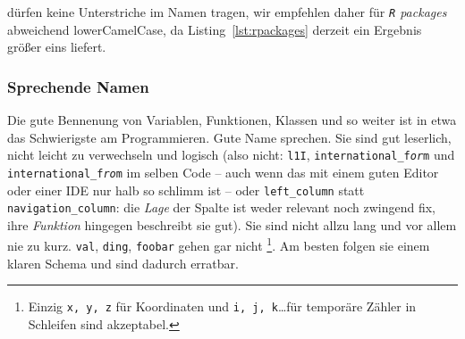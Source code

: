 \documentclass[twoside]{scrartcl}
\providecommand{\R}{\texttt{R}}
\providecommand{\code}[1]{\texttt{#1}}
\begin{document}
 d\"urfen keine Unterstriche im Namen 
tragen, wir
empfehlen daher f\"u{}r \emph{\R{} packages} abweichend lowerCamelCase, 
da Listing~\ref{lst:rpackages} derzeit ein Ergebnis gr\"o{}\ss{}er eins 
liefert.


\subsubsection{Sprechende Namen}
Die gute Bennenung von Variablen, Funktionen, Klassen und so weiter ist in etwa
das Schwierigste am Programmieren. Gute Name sprechen. Sie sind gut leserlich,
nicht leicht zu verwechseln und logisch (also nicht: \code{l1I},
\code{international\_f\emph{or}m} und \code{international\_f\emph{ro}m} im 
selben Code -- auch wenn das mit einem guten Editor oder einer IDE nur halb so 
schlimm ist -- oder \code{left\_column} statt \code{navigation\_column}: die 
\emph{Lage} der Spalte ist weder relevant noch zwingend fix, ihre 
\emph{Funktion} hingegen beschreibt sie gut).
Sie sind nicht allzu lang und vor allem nie zu kurz.
\code{val}, \code{ding}, \code{foobar} gehen gar nicht%
\footnote{Einzig \code{x, y, z} f\"ur Koordinaten
  und \code{i, j, k}\ldots f\"ur tempor\"a{}re Z\"a{}hler in Schleifen sind
  akzeptabel.}.
Am besten folgen sie einem klaren Schema und sind dadurch erratbar.
\end{document}
